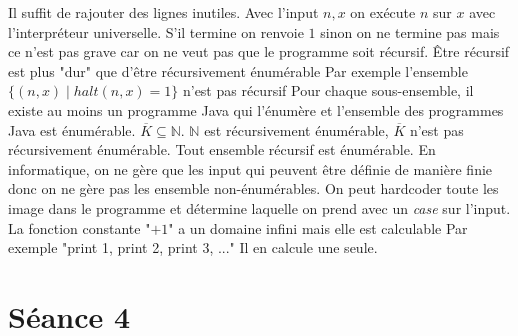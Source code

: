 \begin{mcqs}
  {Il suffit de rajouter des lignes inutiles.}
  {Avec l'input $n,x$ on exécute $n$ sur $x$ avec l’interpréteur universelle.
  S'il termine on renvoie $1$ sinon on ne termine pas mais ce n'est pas grave car on ne veut pas que le programme soit récursif.}
  {Être récursif est plus "dur" que d'être récursivement énumérable}
  {Par exemple l'ensemble $\{(n,x) \mid \mathit{halt}(n,x)=1\}$ n'est pas récursif}
  {Pour chaque sous-ensemble, il existe au moins un programme Java qui l'énumère et l'ensemble des programmes Java est énumérable.}
  {$\overline{K} \subseteq \mathbb{N}$. $\mathbb{N}$ est récursivement énumérable, $\overline{K}$ n'est pas récursivement énumérable.}
  {Tout ensemble récursif est énumérable. En informatique, on ne gère que les input qui peuvent être définie de manière finie
  donc on ne gère pas les ensemble non-énumérables.}
  {On peut hardcoder toute les image dans le programme et détermine laquelle on prend avec un \textit{case} sur l'input.}
  {La fonction constante "$+1$" a un domaine infini mais elle est calculable}
  {Par exemple "print 1, print 2, print 3, ..."}
  {Il en calcule une seule.}
\end{mcqs}

\section*{Séance 4}

